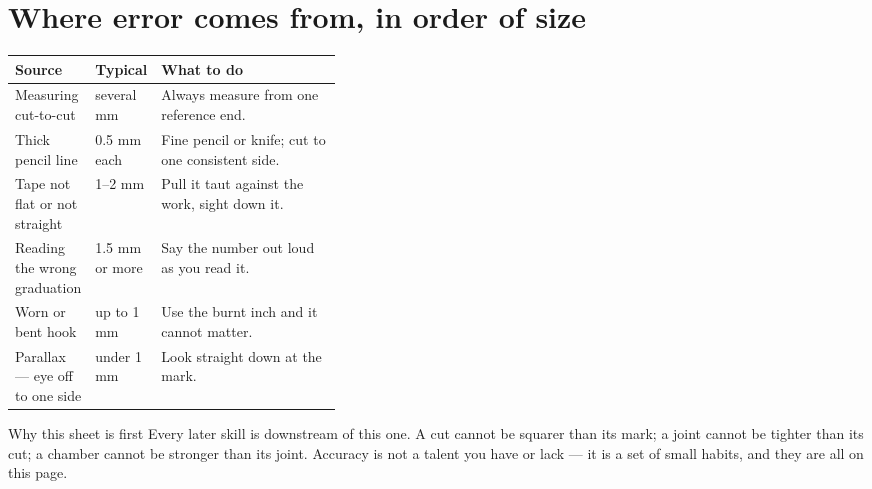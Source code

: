 \section{Where error comes from, in order of size}
\begin{tabularx}{\linewidth}{@{}p{0.24\linewidth}p{0.14\linewidth}L@{}}
\toprule
\textbf{Source} & \textbf{Typical} & \textbf{What to do}\\
\midrule
Measuring cut-to-cut & several mm & Always measure from one reference end.\\
Thick pencil line & 0.5 mm each & Fine pencil or knife; cut to one consistent side.\\
Tape not flat or not straight & 1--2 mm & Pull it taut against the work, sight down it.\\
Reading the wrong graduation & 1.5 mm or more & Say the number out loud as you read it.\\
Worn or bent hook & up to 1 mm & Use the burnt inch and it cannot matter.\\
Parallax --- eye off to one side & under 1 mm & Look straight down at the mark.\\
\bottomrule
\end{tabularx}


\begin{telospanel}{Why this sheet is first}
Every later skill is downstream of this one. A cut cannot be squarer than its
mark; a joint cannot be tighter than its cut; a chamber cannot be stronger than
its joint. Accuracy is not a talent you have or lack --- it is a set of small
habits, and they are all on this page.
\end{telospanel}

